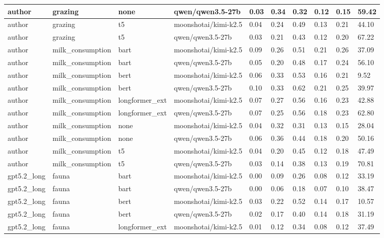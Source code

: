 \begin{tabular}{|l|l|l|l|l|l|l|l|l|l|}
 \hline
 author & grazing & none & qwen/qwen3.5-27b & 0.03 & 0.34 & 0.32 & 0.12 & 0.15 & 59.42 \\
 \hline
 author & grazing & t5 & moonshotai/kimi-k2.5 & 0.04 & 0.24 & 0.49 & 0.13 & 0.21 & 44.10 \\
 \hline
 author & grazing & t5 & qwen/qwen3.5-27b & 0.03 & 0.21 & 0.43 & 0.12 & 0.20 & 67.22 \\
 \hline
 author & milk\_consumption & bart & moonshotai/kimi-k2.5 & 0.09 & 0.26 & 0.51 & 0.21 & 0.26 & 37.09 \\
 \hline
 author & milk\_consumption & bart & qwen/qwen3.5-27b & 0.05 & 0.20 & 0.48 & 0.17 & 0.24 & 56.10 \\
 \hline
 author & milk\_consumption & bert & moonshotai/kimi-k2.5 & 0.06 & 0.33 & 0.53 & 0.16 & 0.21 & 9.52 \\
 \hline
 author & milk\_consumption & bert & qwen/qwen3.5-27b & 0.10 & 0.33 & 0.62 & 0.21 & 0.25 & 39.97 \\
 \hline
 author & milk\_consumption & longformer\_ext & moonshotai/kimi-k2.5 & 0.07 & 0.27 & 0.56 & 0.16 & 0.23 & 42.88 \\
 \hline
 author & milk\_consumption & longformer\_ext & qwen/qwen3.5-27b & 0.07 & 0.25 & 0.56 & 0.18 & 0.23 & 62.80 \\
 \hline
 author & milk\_consumption & none & moonshotai/kimi-k2.5 & 0.04 & 0.32 & 0.31 & 0.13 & 0.15 & 28.04 \\
 \hline
 author & milk\_consumption & none & qwen/qwen3.5-27b & 0.06 & 0.36 & 0.44 & 0.18 & 0.20 & 50.16 \\
 \hline
 author & milk\_consumption & t5 & moonshotai/kimi-k2.5 & 0.04 & 0.20 & 0.45 & 0.12 & 0.18 & 47.49 \\
 \hline
 author & milk\_consumption & t5 & qwen/qwen3.5-27b & 0.03 & 0.14 & 0.38 & 0.13 & 0.19 & 70.81 \\
 \hline
 gpt5.2\_long & fauna & bart & moonshotai/kimi-k2.5 & 0.00 & 0.09 & 0.26 & 0.08 & 0.12 & 33.19 \\
 \hline
 gpt5.2\_long & fauna & bart & qwen/qwen3.5-27b & 0.00 & 0.06 & 0.18 & 0.07 & 0.10 & 38.47 \\
 \hline
 gpt5.2\_long & fauna & bert & moonshotai/kimi-k2.5 & 0.03 & 0.22 & 0.52 & 0.14 & 0.17 & 10.57 \\
 \hline
 gpt5.2\_long & fauna & bert & qwen/qwen3.5-27b & 0.02 & 0.17 & 0.40 & 0.14 & 0.18 & 31.19 \\
 \hline
 gpt5.2\_long & fauna & longformer\_ext & moonshotai/kimi-k2.5 & 0.01 & 0.12 & 0.34 & 0.08 & 0.12 & 37.49 \\

\end{tabular}
